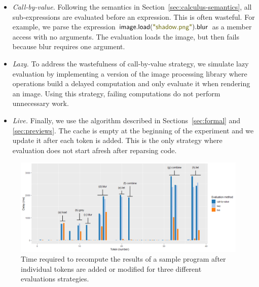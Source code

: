 \documentclass[english,submission]{programming}
\theoremstyle{plain}
\theoremstyle{definition}
\newcommand{\str}[1]{\textnormal{\textcolor{strclr}{\sffamily "#1"}}}
\newcommand{\ident}[1]{\textnormal{\textcolor{idclr}{\sffamily #1}}}
\begin{document}
\begin{itemize}
\item \emph{Call-by-value.} Following the semantics in Section~\ref{sec:calculus-semantics},
  all sub-expressions are evaluated before an expression. This is often wasteful. For example,
  we parse the expression $\ident{image}.\ident{load}(\str{shadow.png}).\ident{blur}$ as a member access with no
  arguments. The evaluation loads the image, but then fails because blur requires one argument.

\item \emph{Lazy.} To address the wastefulness of call-by-value strategy, we
  simulate lazy evaluation by implementing a version of the image processing library where
  operations build a delayed computation and only evaluate it when rendering an image. Using
  this strategy, failing computations do not perform unnecessary work.

\item \emph{Live.} Finally, we use the algorithm described in
  Sections~\ref{sec:formal} and \ref{sec:previews}. The cache is empty at the beginning of the
  experiment and we update it after each token is added. This is the only strategy where
  evaluation does not start afresh after reparsing code.
\end{itemize}


\begin{figure}[t]
\vspace{-0.5em}
\includegraphics[scale=0.425]{figures/drawing.png}
\caption{Time required to recompute the results of a sample program after individual tokens
  are added or modified for three different evaluations strategies.}
\label{fig:drawing}
\vspace{-0.5em}
\end{figure}

\end{document}
